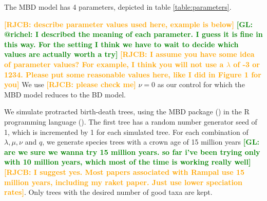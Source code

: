 \documentclass{article}
\newcommand*\richel[1]{\textcolor{orange}{\textbf{[RJCB: #1]}}}
\newcommand*\gio[1]{\textcolor{green}{\textbf{[GL: #1]}}}
\begin{document}

The MBD model has 4 parameters, depicted in table \ref{table:parameters}. 

\richel{describe parameter values used here, example is below}
\gio{@richel: I described the meaning of each parameter. I guess it is fine in this way. For the setting I think we have to wait to decide which values are actually worth a try}
\richel{I assume you have some idea of parameter values? For example, I think you will not use a $\lambda$ of -3 or 1234. Please put some reasonable values here, like I did in Figure 1 for you}
We use \richel{please check me} $\nu = 0$ as our control for which the MBD model reduces to the BD model.

We simulate protracted birth-death trees, using the MBD package (\cite{pbd}) in the R programming language (\cite{r}).
The first tree has a random number generator seed of 1, which is incremented by 1 for each simulated tree.
For each combination of $\lambda, \mu, \nu$ and $q$, 
we generate species trees with a crown age of 15 million years 
\gio{are we sure we wanna try 15 million years. so far i've been trying only with 10 million years, which most of the time is working really well}
\richel{I suggest yes. Most papers associated with Rampal use 15 million years, including my raket paper. Just use lower speciation rates}.
Only trees with the desired number of good taxa are kept.
\end{document}
